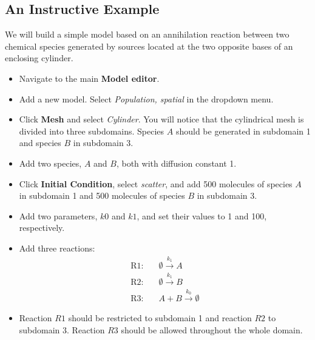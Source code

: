 \subsection{An Instructive Example}
We will build a simple model based on an annihilation reaction between two chemical species generated  by sources located at the two opposite bases of an enclosing cylinder.
\begin{itemize}
\item Navigate to the main \textbf{Model editor}.
\item Add a new model. Select \textit{Population, spatial} in the dropdown menu.
 \item Click \textbf{Mesh} and select \textit{Cylinder}. You will notice that the cylindrical mesh is divided into three subdomains. Species $A$ should be generated in subdomain 1 and species $B$ in subdomain 3.
\item Add two species, $A$ and $B$, both with diffusion constant 1.
\item Click \textbf{Initial Condition}, select \textit{scatter}, and add 500 molecules of species $A$ in subdomain 1 and 500 molecules of species $B$ in subdomain 3. 
\item Add two parameters, $k0$ and $k1$, and set their values to 1 and 100, respectively.
\item Add three reactions:%
\begin{align*}
\textrm{R1}:&\quad \emptyset\overset{k_1}{\rightarrow} A\\
\textrm{R2}:&\quad \emptyset\overset{k_1}{\rightarrow} B\\
\textrm{R3}:&\quad A+B\overset{k_0}{\rightarrow}\emptyset
\end{align*}
\item Reaction $R1$ should be restricted to subdomain 1 and reaction $R2$ to subdomain 3. Reaction $R3$ should be allowed throughout the whole domain.

\end{itemize}
